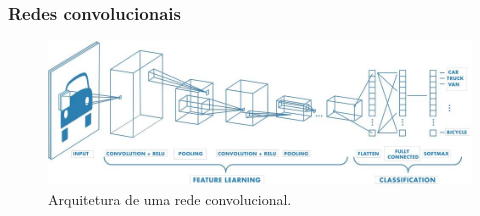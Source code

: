 \documentclass{beamer}
\begin{document}
\begin{frame}
    \frametitle{Redes convolucionais}
        \begin{figure}[!ht]
            \centering
            \includegraphics[width=0.95\columnwidth]{
                Imagens/CNN_mathworks.jpg
            }
            \caption{Arquitetura de uma rede convolucional. }
            \label{fig:cnn}
        \end{figure}





\end{frame}
\end{document}
